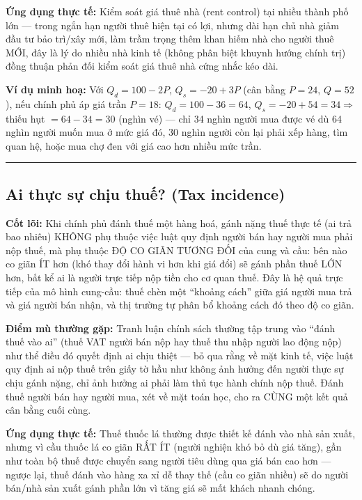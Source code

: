 \documentclass[
]{article}
\begin{document}
\textbf{Ứng dụng thực tế:} Kiểm soát giá thuê nhà (rent control) tại
nhiều thành phố lớn --- trong ngắn hạn người thuê hiện tại có lợi, nhưng
dài hạn chủ nhà giảm đầu tư bảo trì/xây mới, làm trầm trọng thêm khan
hiếm nhà cho người thuê MỚI, đây là lý do nhiều nhà kinh tế (không phân
biệt khuynh hướng chính trị) đồng thuận phản đối kiểm soát giá thuê nhà
cứng nhắc kéo dài.

\textbf{Ví dụ minh hoạ:} Với \(Q_d = 100 - 2P\), \(Q_s = -20 + 3P\) (cân
bằng \(P = 24\), \(Q = 52\)), nếu chính phủ áp giá trần \(P = 18\):
\(Q_d = 100 - 36 = 64\), \(Q_s = -20 + 54 = 34 \Rightarrow\) thiếu hụt
\(= 64 - 34 = 30\) (nghìn vé) --- chỉ 34 nghìn người mua được vé dù 64
nghìn người muốn mua ở mức giá đó, 30 nghìn người còn lại phải xếp hàng,
tìm quan hệ, hoặc mua chợ đen với giá cao hơn nhiều mức trần.

\begin{center}\rule{0.5\linewidth}{0.5pt}\end{center}

\subsection{Ai thực sự chịu thuế? (Tax
incidence)}\label{ai-thux1ef1c-sux1ef1-chux1ecbu-thuux1ebf-tax-incidence}

\textbf{Cốt lõi:} Khi chính phủ đánh thuế một hàng hoá, gánh nặng thuế
thực tế (ai trả bao nhiêu) KHÔNG phụ thuộc việc luật quy định người bán
hay người mua phải nộp thuế, mà phụ thuộc ĐỘ CO GIÃN TƯƠNG ĐỐI của cung
và cầu: bên nào co giãn ÍT hơn (khó thay đổi hành vi hơn khi giá đổi) sẽ
gánh phần thuế LỚN hơn, bất kể ai là người trực tiếp nộp tiền cho cơ
quan thuế. Đây là hệ quả trực tiếp của mô hình cung-cầu: thuế chèn một
``khoảng cách'' giữa giá người mua trả và giá người bán nhận, và thị
trường tự phân bổ khoảng cách đó theo độ co giãn.

\textbf{Điểm mù thường gặp:} Tranh luận chính sách thường tập trung vào
``đánh thuế vào ai'' (thuế VAT người bán nộp hay thuế thu nhập người lao
động nộp) như thể điều đó quyết định ai chịu thiệt --- bỏ qua rằng về
mặt kinh tế, việc luật quy định ai nộp thuế trên giấy tờ hầu như không
ảnh hưởng đến người thực sự chịu gánh nặng, chỉ ảnh hưởng ai phải làm
thủ tục hành chính nộp thuế. Đánh thuế người bán hay người mua, xét về
mặt toán học, cho ra CÙNG một kết quả cân bằng cuối cùng.

\textbf{Ứng dụng thực tế:} Thuế thuốc lá thường được thiết kế đánh vào
nhà sản xuất, nhưng vì cầu thuốc lá co giãn RẤT ÍT (người nghiện khó bỏ
dù giá tăng), gần như toàn bộ thuế được chuyển sang người tiêu dùng qua
giá bán cao hơn --- ngược lại, thuế đánh vào hàng xa xỉ dễ thay thế (cầu
co giãn nhiều) sẽ do người bán/nhà sản xuất gánh phần lớn vì tăng giá sẽ
mất khách nhanh chóng.
\end{document}
